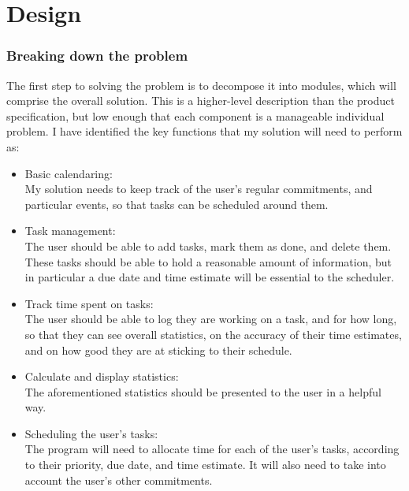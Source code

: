 \documentclass{article}
\begin{document}
\part{Design}
\section{Breaking down the problem}
The first step to solving the problem is to decompose it into modules,
which will comprise the overall solution.
This is a higher-level description than the product specification,
but low enough that each component is a manageable individual problem.
I have identified the key functions that my solution will need to perform as:
\begin{itemize}
	\item Basic calendaring:\\
	      My solution needs to keep track of the user's regular commitments,
	      and particular events,
	      so that tasks can be scheduled around them.
	\item Task management:\\
	      The user should be able to add tasks,
	      mark them as done,
	      and delete them.
	      These tasks should be able to hold a reasonable amount of information,
	      but in particular a due date and time estimate will be essential to the scheduler.
	\item Track time spent on tasks:\\
	      The user should be able to log they are working on a task,
	      and for how long,
	      so that they can see overall statistics,
	      on the accuracy of their time estimates,
	      and on how good they are at sticking to their schedule.
	\item Calculate and display statistics:\\
	      The aforementioned statistics should be presented to the user in a helpful way.
	\item Scheduling the user's tasks:\\
	      The program will need to allocate time for each of the user's tasks,
	      according to their priority,
	      due date,
	      and time estimate.
	      It will also need to take into account the user's other commitments.
\end{itemize}
\end{document}
